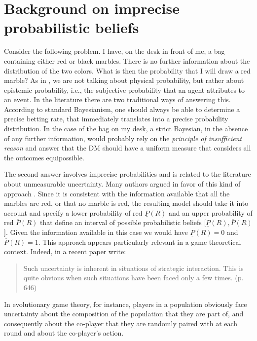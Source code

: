 \documentclass[fleqn,reqno,11pt]{article}
\begin{document}
\appendix

\section{Background on imprecise probabilistic beliefs}
\label{sec:impr-prob-beli}

Consider the following problem. I have, on the desk in front of me, a bag containing either red
or black marbles. There is no further information about the distribution of the two
colors. What is then the probability that I will draw a red marble? As in \citet{walley96}, we
are not talking about physical probability, but rather about epistemic probability, i.e., the
subjective probability that an agent attributes to an event.  In the literature there are two
traditional ways of answering this. According to standard Bayesianism, one should always be
able to determine a precise betting rate, that immediately translates into a precise
probability distribution. In the case
of the bag on my desk, a strict Bayesian, in the absence of any further information, would
probably rely on the \textit{principle of insufficient reason} and answer that the DM should
have a uniform measure that considers all the outcomes equipossible.


The second answer involves imprecise probabilities and is related to the literature about
unmeasurable uncertainty. Many authors argued in favor of this kind of approach
\citep[e.g.,][]{levi74,gardsah82,walley96}. Since it is consistent with the information
available that all the marbles are red, or that no marble is red, the resulting model should
take it into account and specify a lower probability of red $\underline{P}(R)$ and an upper
probability of red $\overline{P}(R)$ that define an interval of possible probabilistic beliefs
[$\underline{P}(R), \overline{P}(R)$]. Given the information available in this case we would
have $\underline{P}(R)=0$ and $\overline{P}(R)=1$. This approach appears particularly relevant
in a game theoretical context. Indeed, in a recent paper \citet{BattCerrMM15} write:

\begin{quote}
  Such uncertainty is inherent in situations of strategic interaction. This is quite obvious
  when such situations have been faced only a few times. (p. 646)
\end{quote}

\noindent In evolutionary game theory, for instance, players in a population obviously face
uncertainty about the composition of the population that they are part of, and consequently
about the co-player that they are randomly paired with at each round and about the co-player's
action. 
\end{document}
